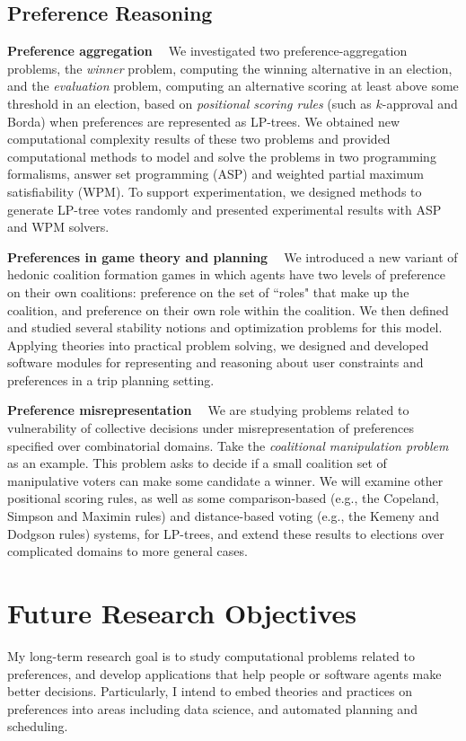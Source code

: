 \documentclass[11pt]{article}
\begin{document}
\subsection{Preference Reasoning}
\smallskip \noindent \textbf{Preference aggregation  \ }
We investigated two preference-aggregation 
problems, the \emph{winner} problem, computing the winning alternative in an election,
and the \emph{evaluation} problem, computing an alternative scoring at least above
some threshold in an election,
based on \textit{positional scoring rules} (such as $k$-approval and Borda) 
when preferences are represented as LP-trees\cite{LiuT:LPT_ASP}. 
We obtained new computational complexity results of these two problems and
provided computational methods to model and solve the problems in two programming formalisms, 
answer set programming (ASP) and weighted partial maximum satisfiability (WPM).
To support experimentation, we designed methods
to generate LP-tree votes randomly and presented experimental results
with ASP and WPM solvers.

\smallskip \noindent \textbf{Preferences in game theory and planning  \ }
We introduced a new variant of hedonic coalition formation
games in which agents have two levels of preference on their own coalitions:
preference on the set of ``roles" that make up the coalition, and
preference on their own role within the coalition\cite{Spradling}. 
We then defined and studied several stability
notions and optimization problems for this model.
Applying theories into practical problem solving, we designed and developed software modules
for representing and reasoning about user constraints and preferences in a trip planning
setting.

\smallskip \noindent \textbf{Preference misrepresentation  \ }
We are studying problems related to vulnerability of collective decisions under misrepresentation of preferences
specified over combinatorial domains.
Take the \textit{coalitional manipulation problem} as an example.
This problem asks to decide if a small coalition set of manipulative
voters can make some candidate a winner.
We will examine other positional scoring rules, as well as
some comparison-based (e.g., the Copeland, Simpson and Maximin rules) and 
distance-based voting (e.g., the Kemeny and Dodgson rules) systems, for LP-trees,
and extend these results to elections over complicated domains to more general cases.

\section{Future Research Objectives}
\noindent My long-term research goal is to study computational problems related to preferences, and 
develop applications that help people or software agents make better decisions.
Particularly, I intend to embed theories and practices on preferences into areas including
data science, and automated planning and scheduling.
\end{document}
